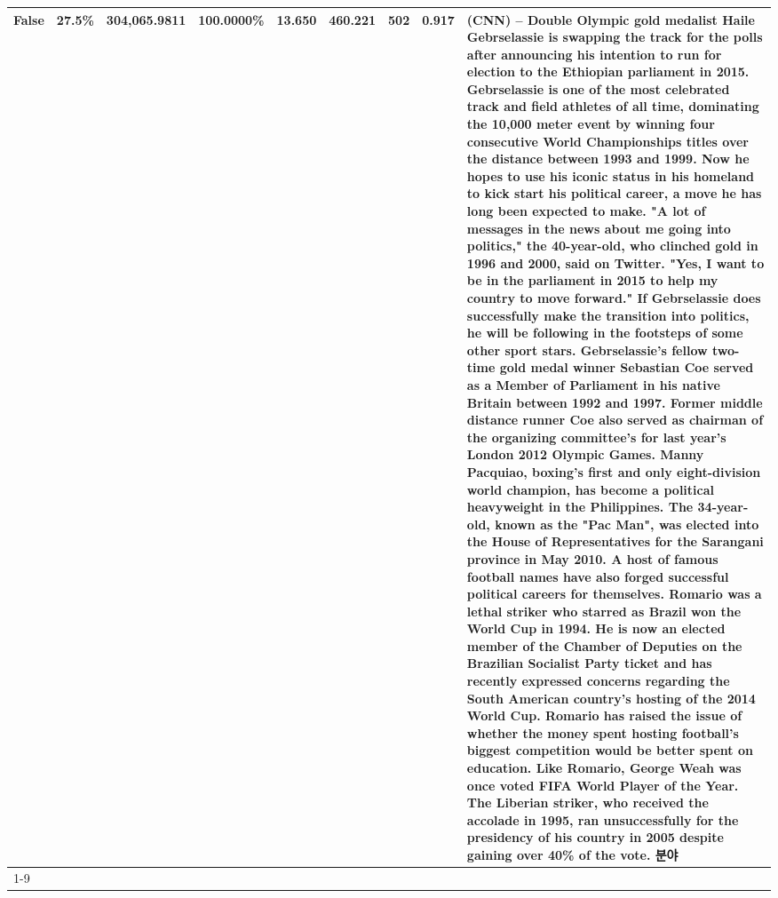\begin{table}[H]
{\begin{tabular}{lllrlllll}
False & 27.5\% & 304,065.9811 & \bfseries \color{red} 100.0000\% & 13.650 & 460.221 & 502 & 0.917 & (CNN) -- Double Olympic gold medalist Haile Gebrselassie is swapping the track for the polls after announcing his intention to run for election to the Ethiopian parliament in 2015. Gebrselassie is one of the most celebrated track and field athletes of all time, dominating the 10,000 meter event by winning four consecutive World Championships titles over the distance between 1993 and 1999. Now he hopes to use his iconic status in his homeland to kick start his political career, a move he has long been expected to make. "A lot of messages in the news about me going into politics," the 40-year-old, who clinched gold in 1996 and 2000, said on Twitter. "Yes, I want to be in the parliament in 2015 to help my country to move forward." If Gebrselassie does successfully make the transition into politics, he will be following in the footsteps of some other sport stars. Gebrselassie's fellow two-time gold medal winner Sebastian Coe served as a Member of Parliament in his native Britain between 1992 and 1997. Former middle distance runner Coe also served as chairman of the organizing committee's for last year's London 2012 Olympic Games. Manny Pacquiao, boxing's first and only eight-division world champion, has become a political heavyweight in the Philippines. The 34-year-old, known as the "Pac Man", was elected into the House of Representatives for the Sarangani province in May 2010. A host of famous football names have also forged successful political careers for themselves. Romario was a lethal striker who starred as Brazil won the World Cup in 1994. He is now an elected member of the Chamber of Deputies on the Brazilian Socialist Party ticket and has recently expressed concerns regarding the South American country's hosting of the 2014 World Cup. Romario has raised the issue of whether the money spent hosting football's biggest competition would be better spent on education. Like Romario, George Weah was once voted FIFA World Player of the Year. The Liberian striker, who received the accolade in 1995, ran unsuccessfully for the presidency of his country in 2005 despite gaining over 40\% of the vote. 분야 \\
\cline{1-9}

\end{tabular}}
\end{table}
